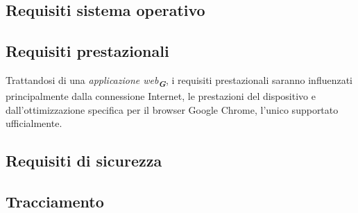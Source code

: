 \subsection{Requisiti sistema operativo}

\subsection{Requisiti prestazionali}
Trattandosi di una \emph{applicazione web}\textsubscript{\textit{\textbf{G}}}, i requisiti prestazionali saranno influenzati principalmente dalla connessione Internet, 
le prestazioni del dispositivo e dall'ottimizzazione specifica per il browser Google Chrome, l'unico supportato ufficialmente.

\subsection{Requisiti di sicurezza}

\subsection{Tracciamento}


